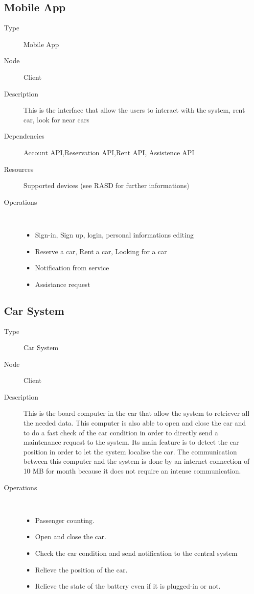 \subsection{Mobile App}
\begin{description}
	\item[Type] Mobile App
	\item[Node] Client
	\item[Description] This is the interface that allow the users to interact with the system, rent car, look for near cars
	\item[Dependencies] Account API,Reservation API,Rent API, Assistence API
	\item[Resources] Supported devices (see RASD for further informations)
	\item[Operations] \ \\
		\begin{itemize}
			\item Sign-in, Sign up, login, personal informations editing
			\item Reserve a car, Rent a car, Looking for a car
			\item Notification from service
			\item Assistance request
	\end{itemize}
\end{description}

\subsection{Car System}
\begin{description}
	\item[Type] Car System
	\item[Node] Client
	\item[Description] This is the board computer in the car that allow the system to retriever all the needed data. This computer is also able to open and close the car and to do a fast check of the car condition in order to directly send a maintenance request to the system. Its main feature is to detect the car position in order to let the system localise the car. The communication between this computer and the system is done by an internet connection of 10 MB for month because it does not require an intense communication.
	\item[Operations] \ \\
		\begin{itemize}
			\item Passenger counting.
			\item Open and close the car.
			\item Check the car condition and send notification to the central system
			\item Relieve the position of the car.
			\item Relieve the state of the battery even if it is plugged-in or not.
		\end{itemize}
\end{description}


